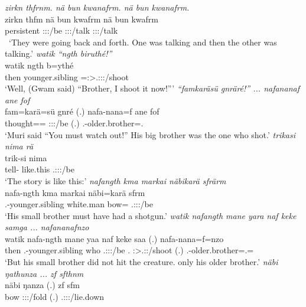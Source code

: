 \begin{exe}
	\emph{zirkn thfrnm. nä bun kwanafrm. nä bun kwanafrm.}\\
	\gll zirkn thfm {nä bun} kwafrm {nä bun} kwafrm\\ 
	persistent \Stdu:\Sbj:\Pst:\Dur/be \Indf{} \Sg:\Sbj:\Pst:\Dur/talk \Indf{} \Sg:\Sbj:\Pst:\Dur/talk\\\
	\trans `They were going back and forth. One was talking and then the other was talking.'
\exi{51} 
	\emph{watik ``ngth biruthé!''}\\
	\gll watik ngth b=ythé\\ 
	then younger.sibling \Med=\Fsg:\Sbj>\Tsg.\Masc:\Obj:\Nonpast:\Ipfv/shoot\\
	\trans `Well, (Gwam said) ``Brother, I shoot it now!'''
	\emph{``famkaräsü gnräré!'' ... nafananaf ane fof}\\
	\gll fam=karä=sü gnré (.) nafa-nana=f ane fof\\ 
	thought=\Prop=\Etc{} \Ssg:\Sbj:\Imp:\Ipfv/be (.) \Third.\Poss-older.brother=\Erg.\Sg{} \Dem{} \Emph{}\\
	\trans `Muri said ``You must watch out!'' His big brother was the one who shot.'
\exi{53} 
	\emph{trikasi nima rä}\\
	\gll trik-si nima \\ 
	tell-\Nmlz{} like.this \Tsg.\F:\Sbj:\Nonpast:\Ipfv/be\\
	\trans `The story is like this:'
	\emph{nafangth kma markai näbikarä sfrärm}\\
	\gll nafa-ngth kma markai näbi=karä sfrm\\ 
	\Third.\Poss-younger.sibling \Pot{} white.man bow=\Prop{} \Tsg.\Masc:\Sbj:\Pst:\Dur/be\\
	\trans `His small brother must have had a shotgun.'
	\emph{watik nafangth mane yara naf keke samga ... nafananafnzo}\\
	\gll watik nafa-ngth mane yaa naf keke saa (.) nafa-nana=f=nzo\\ 
	then \Third.\Poss-younger.sibling who \Tsg.\Masc:\Sbj:\Pst:\Ipfv/be \Tsg.\Erg{} \Neg{} \Sg:\Sbj>\Tsg.\Masc:\Pst:\Pfv/shoot (.) \Third.\Poss-older.brother=\Erg.\Sg=\Only\\
	\trans `But his small brother did not hit the creature. only his older brother.'
\exi{56} 
	\emph{näbi ŋathunza ... zf sfthnm}\\
	\gll näbi ŋanza (.) zf sfm\\ 
	bow \Sg:\Sbj:\Pst:\Ipfv/fold (.) \Imm{} \Tsg.\Masc:\Sbj:\Pst:\Dur/lie.down\\

\end{exe}
